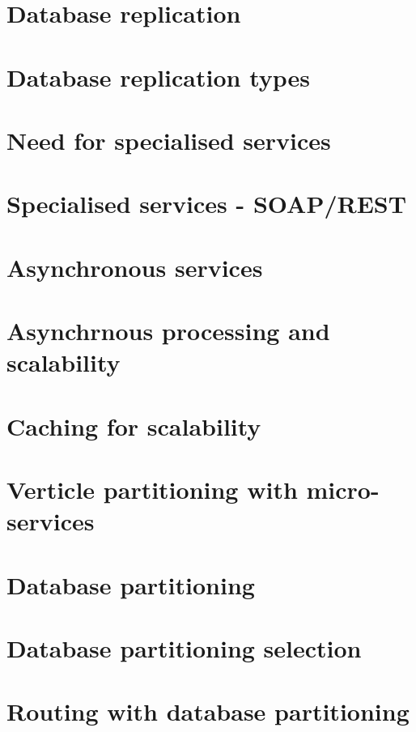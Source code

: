 \documentclass[11pt]{article}
\begin{document}
\section{Database replication}

\section{Database replication types}

\section{Need for specialised services}

\section{Specialised services - SOAP/REST}

\section{Asynchronous services}

\section{Asynchrnous processing and scalability}

\section{Caching for scalability}

\section{Verticle partitioning with micro-services}

\section{Database partitioning}

\section{Database partitioning selection}

\section{Routing with database partitioning}
\end{document}
